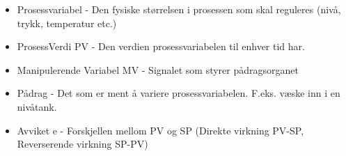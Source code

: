 \begin{itemize}
\item Prosessvariabel - Den fysiske størrelsen i prosessen som skal reguleres (nivå, trykk, temperatur etc.)
\item ProsessVerdi PV - Den verdien prosessvariabelen til enhver tid har.
\item Manipulerende Variabel MV - Signalet som styrer pådragsorganet
\item Pådrag - Det som er ment å variere prosessvariabelen. F.eks. væske inn i en nivåtank. 
\item Avviket e - Forskjellen mellom PV og SP (Direkte virkning PV-SP, Reverserende virkning SP-PV)
\end{itemize}












